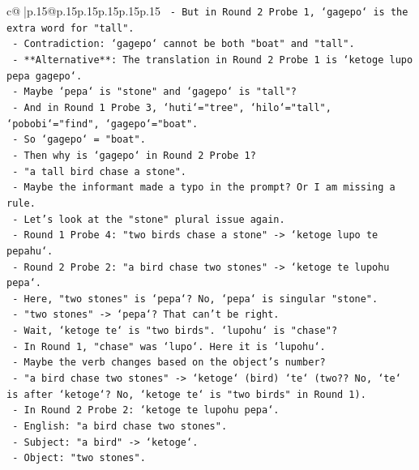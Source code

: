 \documentclass{article}
\begin{document}
{\begin{supertabular}{c@{$\;$}|p{.15\linewidth}@{}p{.15\linewidth}p{.15\linewidth}p{.15\linewidth}p{.15\linewidth}p{.15\linewidth}}
{{{\texttt{          {-} But in Round 2 Probe 1, `gagepo` is the extra word for "tall".} \\
\texttt{          {-} Contradiction: `gagepo` cannot be both "boat" and "tall".} \\
\texttt{          {-} **Alternative**: The translation in Round 2 Probe 1 is `ketoge lupo pepa gagepo`.} \\
\texttt{          {-} Maybe `pepa` is "stone" and `gagepo` is "tall"?} \\
\texttt{          {-} And in Round 1 Probe 3, `huti`="tree", `hilo`="tall", `pobobi`="find", `gagepo`="boat".} \\
\texttt{          {-} So `gagepo` = "boat".} \\
\texttt{          {-} Then why is `gagepo` in Round 2 Probe 1?} \\
\texttt{          {-} "a tall bird chase a stone".} \\
\texttt{          {-} Maybe the informant made a typo in the prompt? Or I am missing a rule.} \\
\texttt{          {-} Let's look at the "stone" plural issue again.} \\
\texttt{          {-} Round 1 Probe 4: "two birds chase a stone" {-}> `ketoge lupo te pepahu`.} \\
\texttt{          {-} Round 2 Probe 2: "a bird chase two stones" {-}> `ketoge te lupohu pepa`.} \\
\texttt{          {-} Here, "two stones" is `pepa`? No, `pepa` is singular "stone".} \\
\texttt{          {-} "two stones" {-}> `pepa`? That can't be right.} \\
\texttt{          {-} Wait, `ketoge te` is "two birds". `lupohu` is "chase"?} \\
\texttt{          {-} In Round 1, "chase" was `lupo`. Here it is `lupohu`.} \\
\texttt{          {-} Maybe the verb changes based on the object's number?} \\
\texttt{          {-} "a bird chase two stones" {-}> `ketoge` (bird) `te` (two?? No, `te` is after `ketoge`? No, `ketoge te` is "two birds" in Round 1).} \\
\texttt{          {-} In Round 2 Probe 2: `ketoge te lupohu pepa`.} \\
\texttt{          {-} English: "a bird chase two stones".} \\
\texttt{          {-} Subject: "a bird" {-}> `ketoge`.} \\
\texttt{          {-} Object: "two stones".} \\
}}}
\end{supertabular}}
\end{document}
